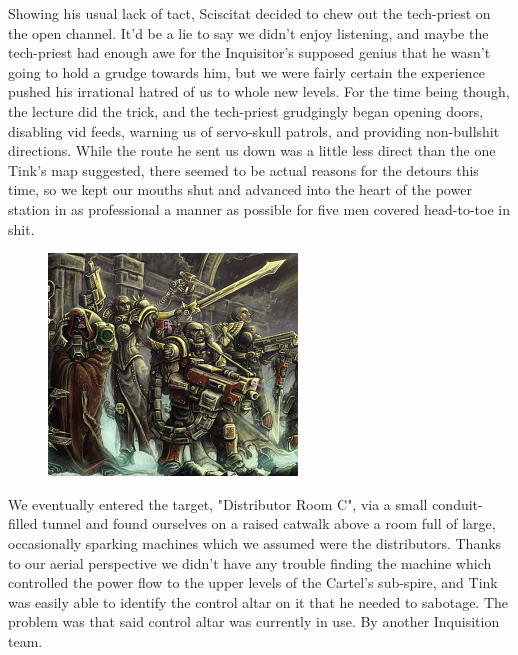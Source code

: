 Showing his usual lack of tact, Sciscitat decided to chew out the tech-priest on the open channel. 
It'd be a lie to say we didn't enjoy listening, and maybe the tech-priest had enough awe for the Inquisitor's supposed genius that he wasn't going to hold a grudge towards him, but we were fairly certain the experience pushed his irrational hatred of us to whole new levels. 
For the time being though, the lecture did the trick, and the tech-priest grudgingly began opening doors, disabling vid feeds, warning us of servo-skull patrols, and providing non-bullshit directions. 
While the route he sent us down was a little less direct than the one Tink's map suggested, there seemed to be actual reasons for the detours this time, so we kept our mouths shut and advanced into the heart of the power station in as professional a manner as possible for five men covered head-to-toe in shit.

\begin{figure}
	\begin{center}
		\includegraphics[width=\figwidth]{pics/18/11.png}
	\end{center}
\end{figure}
We eventually entered the target, "Distributor Room C", via a small conduit-filled tunnel and found ourselves on a raised catwalk above a room full of large, occasionally sparking machines which we assumed were the distributors. 
Thanks to our aerial perspective we didn't have any trouble finding the machine which controlled the power flow to the upper levels of the Cartel's sub-spire, and Tink was easily able to identify the control altar on it that he needed to sabotage. 
The problem was that said control altar was currently in use. 
By another Inquisition team.

